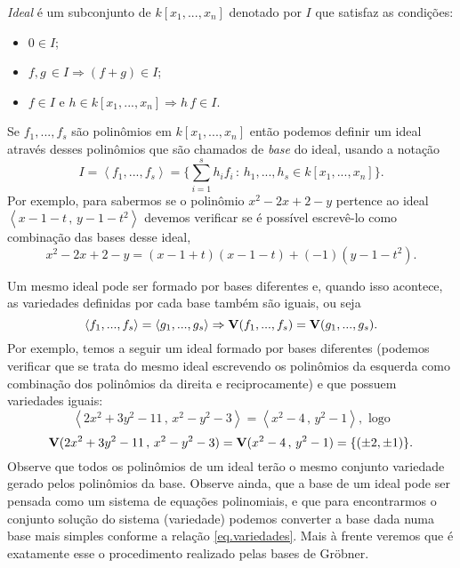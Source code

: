 {\it Ideal} é um subconjunto de $k[x_1,...,x_n]$ denotado por $I$ que satisfaz as condições:
\begin{itemize}
\item $0\in I$;
\item $f,g\,\in I \Rightarrow (f+g)\in I$;
\item $f \in I$ e $h \in k[x_1,...,x_n] \Rightarrow h\,f \in I$. 
\end{itemize}

Se $f_1,...,f_s$ são polinômios em $k[x_1,...,x_n]$ então podemos definir um ideal através desses polinômios que são chamados de {\it base} do ideal, usando a notação
\begin{equation*}
I=\left\langle f_1,...,f_s \right\rangle = \{\sum_{i=1}^s h_if_i\,:\,h_1,...,h_s \in k[x_1,...,x_n]\}.
\end{equation*}
Por exemplo, para sabermos se o polinômio $x^2-2x+2-y$ pertence ao ideal $\left\langle x-1-t\,,\,y-1-t^2 \right\rangle$ devemos verificar se é possível escrevê-lo como combinação das bases desse ideal, 
\begin{equation*}
x^2-2x+2-y=(x-1+t)(x-1-t)+(-1)(y-1-t^2).
\end{equation*}

Um mesmo ideal pode ser formado por bases diferentes e, quando isso acontece, as variedades definidas por cada base também são iguais, ou seja
\begin{equation*}
\left\langle f_1,...,f_s \right\rangle = \left\langle g_1,...,g_s \right\rangle \Rightarrow {\bf V}(f_1,...,f_s)={\bf V}(g_1,...,g_s).
\end{equation*}
Por exemplo, temos a seguir um ideal formado por bases diferentes (podemos verificar que se trata do mesmo ideal escrevendo os polinômios da esquerda como combinação dos polinômios da direita e reciprocamente) e que possuem variedades iguais:
\begin{equation*}
\left\langle 2x^2+3y^2-11\,,\,x^2-y^2-3 \right\rangle = \left\langle x^2-4\,,\,y^2-1 \right\rangle,\,\, \text{logo}
\end{equation*}
\begin{equation}\label{eq.variedades}
{\bf V}(2x^2+3y^2-11\,,\,x^2-y^2-3)={\bf V}(x^2-4\,,\,y^2-1)=\{(\pm2,\pm1)\}.
\end{equation}
Observe que todos os polinômios de um ideal terão o mesmo conjunto variedade gerado pelos polinômios da base. Observe ainda, que a base de um ideal pode ser pensada como um sistema de equações polinomiais, e que para encontrarmos o conjunto solução do sistema (variedade) podemos converter a base dada numa base mais simples conforme a relação \ref{eq.variedades}. Mais à frente veremos que é exatamente esse o procedimento realizado pelas bases de Gr\"obner.

